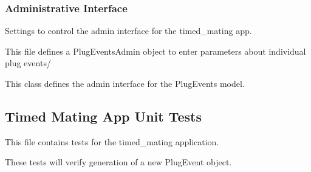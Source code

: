 \documentclass[letterpaper,10pt,english]{sphinxmanual}
\begin{document}
\subsubsection{Administrative Interface}
\label{timed_mating:administrative-interface}\label{timed_mating:module-mousedb.timed_mating.admin}
Settings to control the admin interface for the timed\_mating app.

This file defines a PlugEventsAdmin object to enter parameters about individual plug events/

\begin{fulllineitems}
\label{timed_mating:mousedb.timed_mating.admin.PlugEventsAdmin}
This class defines the admin interface for the PlugEvents model.

\end{fulllineitems}



\subsection{Timed Mating App Unit Tests}
\label{timed_mating:timed-mating-app-unit-tests}\label{timed_mating:module-mousedb.timed_mating.tests}
This file contains tests for the timed\_mating application.

These tests will verify generation of a new PlugEvent object.
\end{document}
